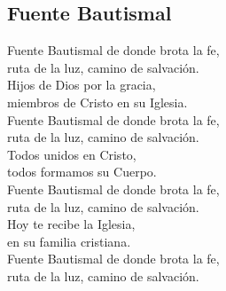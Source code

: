 \subsection{Fuente Bautismal}
\begin{center}

{\Large
Fuente Bautismal de donde brota la fe,\\
ruta de la luz, camino de salvación.\\
\vspace{2ex}
Hijos de Dios por la gracia, \\
miembros de Cristo en su Iglesia.\\
\vspace{2ex}
Fuente Bautismal de donde brota la fe,\\
ruta de la luz, camino de salvación.\\
\vspace{2ex}
Todos unidos en Cristo,\\
todos formamos su Cuerpo.\\
\vspace{2ex}
Fuente Bautismal de donde brota la fe,\\
ruta de la luz, camino de salvación.\\
\vspace{2ex}
Hoy te recibe la Iglesia,\\
en su familia cristiana.\\
\vspace{2ex}
Fuente Bautismal de donde brota la fe,\\
ruta de la luz, camino de salvación.\\
}
\end{center}